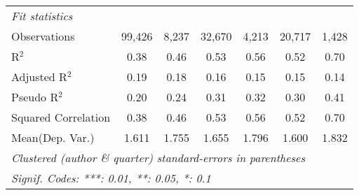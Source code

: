 \begin{tabular}{lcccccc}
   \midrule
   \emph{Fit statistics}\\
   Observations                                               & 99,426       & 8,237   & 32,670       & 4,213        & 20,717        & 1,428\\  
   R$^2$                                                      & 0.38         & 0.46    & 0.53         & 0.56         & 0.52          & 0.70\\  
   Adjusted R$^2$                                             & 0.19         & 0.18    & 0.16         & 0.15         & 0.15          & 0.14\\  
   Pseudo R$^2$                                               & 0.20         & 0.24    & 0.31         & 0.32         & 0.30          & 0.41\\  
   Squared Correlation                                        & 0.38         & 0.46    & 0.53         & 0.56         & 0.52          & 0.70\\  
Mean(Dep. Var.) & 1.611 & 1.755 & 1.655 & 1.796 & 1.600 & 1.832 \\
   \midrule \midrule
   \multicolumn{7}{l}{\emph{Clustered (author \& quarter) standard-errors in parentheses}}\\
   \multicolumn{7}{l}{\emph{Signif. Codes: ***: 0.01, **: 0.05, *: 0.1}}\\
\end{tabular}
\par\endgroup
